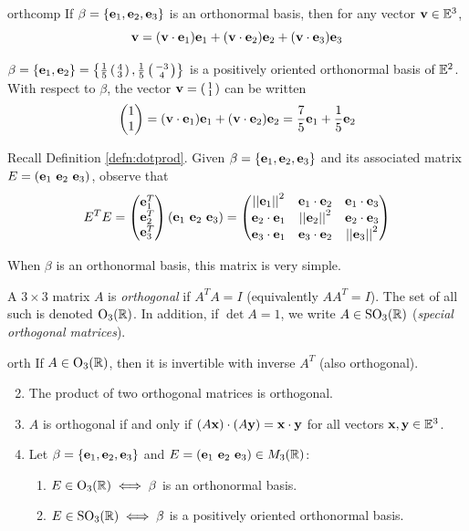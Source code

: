 \begin{lemm}{}{orthcomp}
	If $\beta=\{{\mathbf{e}}_1,{\mathbf{e}}_2,{\mathbf{e}}_3\}$ is an orthonormal basis, then for any vector ${\mathbf{v}}\in\mathbb{E}^3$,
	\[
		{\mathbf{v}}=({\mathbf{v}}\cdot{\mathbf{e}}_1){\mathbf{e}}_1+({\mathbf{v}}\cdot{\mathbf{e}}_2){\mathbf{e}}_2+({\mathbf{v}}\cdot{\mathbf{e}}_3){\mathbf{e}}_3
	\]
\end{lemm}

\begin{example}{}{}
	$\beta =\{{\mathbf{e}}_1,{\mathbf{e}}_2\} =\left\{\frac 15\left(\begin{smallmatrix}4\\3\end{smallmatrix}\right), \frac 15\left(\begin{smallmatrix}-3\\4\end{smallmatrix}\right)\right\}$ is a positively oriented orthonormal basis of $\mathbb{E}^2$. With respect to $\beta$, the vector ${\mathbf{v}}=\left(\begin{smallmatrix}1\\1\end{smallmatrix}\right)$ can be written
	\[
		\begin{pmatrix}1\\1\end{pmatrix}=({\mathbf{v}}\cdot{\mathbf{e}}_1){\mathbf{e}}_1 +({\mathbf{v}}\cdot{\mathbf{e}}_2){\mathbf{e}}_2 =\frac 75{\mathbf{e}}_1+\frac 15{\mathbf{e}}_2
	\]
\end{example}



Recall Definition \ref{defn:dotprod}. Given $\beta=\{{\mathbf{e}}_1,{\mathbf{e}}_2,{\mathbf{e}}_3\}$ and its associated matrix $E=(\ve_1\ \ve_2\ \ve_3)$, observe that
\[
	E^TE=
	\begin{pmatrix}
		{\mathbf{e}}_1^T\\
		{\mathbf{e}}_2^T\\
		{\mathbf{e}}_3^T
	\end{pmatrix}
	({\mathbf{e}}_1\ {\mathbf{e}}_2\ {\mathbf{e}}_3)
	=
	\begin{pmatrix}
		\left| \left| {\mathbf{e}}_1\right|\right|^2&{\mathbf{e}}_1\cdot{\mathbf{e}}_2&{\mathbf{e}}_1\cdot {\mathbf{e}}_3\\
		{\mathbf{e}}_2\cdot{\mathbf{e}}_1&\left| \left| {\mathbf{e}}_2\right|\right|^2&{\mathbf{e}}_2\cdot {\mathbf{e}}_3\\
		{\mathbf{e}}_3\cdot{\mathbf{e}}_1&{\mathbf{e}}_3\cdot {\mathbf{e}}_2&\left| \left| {\mathbf{e}}_3\right|\right|^2
	\end{pmatrix}
\]

When $\beta$ is an orthonormal basis, this matrix is very simple.

\begin{defn}{}{}
	A $3\times 3$ matrix $A$ is \emph{orthogonal} if $A^TA=I$ (equivalently $AA^T=I$). The set of all such is denoted $\mathrm{O}_3(\mathbb{R})$. In addition, if $\det A=1$, we write $A\in \mathrm{SO}_3(\mathbb{R})$ (\emph{special orthogonal matrices}).
\end{defn}

\begin{lemm}{}{orth}
	\exstart If $A\in\mathrm{O}_3(\mathbb{R})$, then it is invertible with inverse $A^T$ (also orthogonal).
	\begin{enumerate}\setcounter{enumi}{1}
	  \item The product of two orthogonal matrices is orthogonal.
	  \item\label{lemm:orth3} $A$ is orthogonal if and only if $(A{\mathbf{x}})\cdot (A{\mathbf{y}})={\mathbf{x}}\cdot{\mathbf{y}}$ for all vectors ${\mathbf{x}},{\mathbf{y}}\in\mathbb{E}^3$.
	  \item Let $\beta=\{{\mathbf{e}}_1,{\mathbf{e}}_2,{\mathbf{e}}_3\}$ and $E=({\mathbf{e}}_1\ {\mathbf{e}}_2\ {\mathbf{e}}_3)\in M_3(\mathbb{R})$:
	  \begin{enumerate}
	    \item $E\in\mathrm{O}_3(\mathbb{R})\iff \beta$ is an orthonormal basis.
	    \item $E\in\mathrm{SO}_3(\mathbb{R})\iff \beta$ is a positively oriented orthonormal basis.
	  \end{enumerate}
	\end{enumerate}
\end{lemm}


